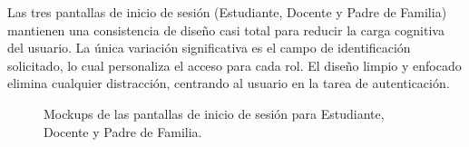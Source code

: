 \begin{samepage}\small
Las tres pantallas de inicio de sesión (Estudiante, Docente y Padre de Familia) mantienen una consistencia de diseño casi total para reducir la carga cognitiva del usuario. La única variación significativa es el campo de identificación solicitado, lo cual personaliza el acceso para cada rol. El diseño limpio y enfocado elimina cualquier distracción, centrando al usuario en la tarea de autenticación.
\begin{figure}[H]
	\centering
	\caption{Mockups de las pantallas de inicio de sesión para Estudiante, Docente y Padre de Familia.}\label{fig:mk-logins}
\end{figure}

\end{samepage}
